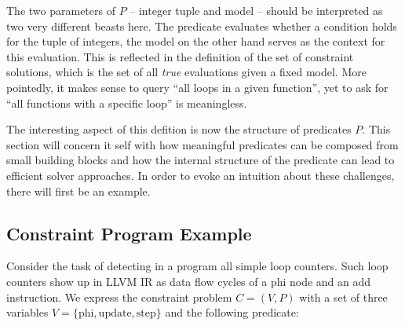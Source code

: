     The two parameters of $P$ -- integer tuple and model -- should be
    interpreted as two very different beasts here.
    The predicate evaluates whether a condition holds for the tuple of integers,
    the model on the other hand serves as the context for this evaluation.
    This is reflected in the definition of the set of constraint solutions,
    which is the set of all {\em true} evaluations given a fixed model.
    More pointedly, it makes sense to query ``all loops in a given function'',
    yet to ask for ``all functions with a specific loop'' is meaningless.
    

    The interesting aspect of this defition is now the structure of predicates
    $P$.
    This section will concern it self with how meaningful predicates can be
    composed from small building blocks and how the internal structure of the
    predicate can lead to efficient solver approaches.
    In order to evoke an intuition about these challenges, there will first be
    an example.

\subsection{Constraint Program Example}

    Consider the task of detecting in a program all simple loop counters.
    Such loop counters show up in LLVM IR as data flow cycles of a phi node
    and an add instruction.
    We express the constraint problem $C=(V,P)$ with a set of three variables
    $V=\{\text{phi}, \text{update}, \text{step}\}$ and the following predicate:

